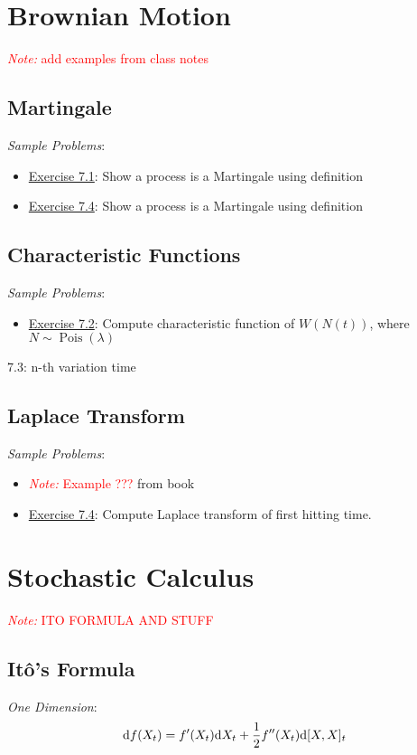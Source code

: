 \documentclass[12pt]{article}
\newcommand{\note}[1]{\textcolor{red}{\textit{Note:} #1}}
\begin{document}
\pagebreak
\section{Brownian Motion}
\note{add examples from class notes}

\subsection{Martingale}
\textit{Sample Problems}: 
\begin{itemize}[nolistsep]
    \item \hyperref[Exercise 7.1]{Exercise 7.1}: Show a process is a Martingale using definition
    \item \hyperref[Exercise 7.4]{Exercise 7.4}: Show a process is a Martingale using definition
\end{itemize}

\subsection{Characteristic Functions}
\textit{Sample Problems}: 
\begin{itemize}[nolistsep]
    \item \hyperref[Exercise 7.2]{Exercise 7.2}: Compute characteristic function of \( W(N(t)) \), where \( N\sim \operatorname{Pois}(\lambda) \)
\end{itemize}

7.3: n-th variation time


\subsection{Laplace Transform}
\textit{Sample Problems}: 
\begin{itemize}[nolistsep]
    \item \note{Example ???} from book
    \item \hyperref[Exercise 7.4]{Exercise 7.4}: Compute Laplace transform of first hitting time.
\end{itemize}


\pagebreak
\section{Stochastic Calculus}

\note{ITO FORMULA AND STUFF}
\subsection{It\^o's Formula}
\textit{One Dimension}:
\begin{align*}
    \mathrm{d} f(X_t) = f'(X_t)\mathrm{d} X_t + \frac{1}{2}f''(X_t)\mathrm{d}[X,X]_t
\end{align*}
\end{document}
